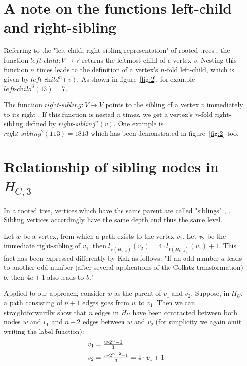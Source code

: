 \section{A note on the functions left-child and right-sibling}
Referring to the "left-child, right-sibling representation" of rooted trees \cite[p.~246]{Ref_Cormen_Leiserson_Rivest_Stein}, the function $\textit{left-child}:V\rightarrow V$ returns the leftmost child of a vertex $v$. Nesting this function $n$ times leads to the definition of a vertex's $n$-fold left-child, which is given by $\textit{left-child}^n(v)$. As shown in figure~\ref{fig:2}, for example $\textit{left-child}^3(13)=7$.

The function $\textit{right-sibling}:V\rightarrow V$ points to the sibling of a vertex $v$ immediately to its right \cite[p.~246]{Ref_Cormen_Leiserson_Rivest_Stein}. If this function is nested $n$ times, we get a vertex's $n$-fold right-sibling defined by $\textit{right-sibling}^n(v)$. One example is $\textit{right-sibling}^2(113)=1813$ which has been demonstrated in figure~\ref{fig:2} too.

\section{\texorpdfstring{Relationship of sibling nodes in $H_{C,3}$}{Relationship of sibling nodes in HC3}}
\label{sec:relationship_sibling_nodes_k3}

In a rooted tree, vertices which have the same parent are called "siblings" \cite[p.~702]{Ref_Johnsonbaugh}, \cite[p.~747]{Ref_Rosen}. Sibling vertices accordingly have the same depth and thus the same level.

Let $w$ be a vertex, from which a path exists to the vertex $v_1$. Let $v_2$ be the immediate right-sibling of $v_1$, then $l_{V\left(H_{C,3}\right)}\left(v_2\right)=4\cdot l_{V\left(H_{C,3}\right)}\left(v_1\right)+1$. This fact has been expressed differently by Kak \cite{Ref_Kak_2014} as follows: "If an odd number $a$ leads to another odd number (after several applications of the Collatz transformation) $b$, then $4a+1$ also leads to $b$."

Applied to our approach, consider $w$ as the parent of $v_1$ and $v_2$. Suppose, in $H_U$, a path consisting of $n+1$ edges goes from $w$ to $v_1$. Then we can straightforwardly show that $n$ edges in $H_U$ have been contracted between both nodes $w$ and $v_1$ and $n+2$ edges between $w$ and $v_2$ (for simplicity we again omit writing the label function):
\begin{equation}
\label{eq:next_sibling_k3}
\begin{array}{l}
		v_1=\frac{w\cdot2^n-1}{3}
		\\[\medskipamount]
		v_2=\frac{w\cdot2^{n+2}-1}{3}=4\cdot v_1+1
\end{array}
\end{equation}

